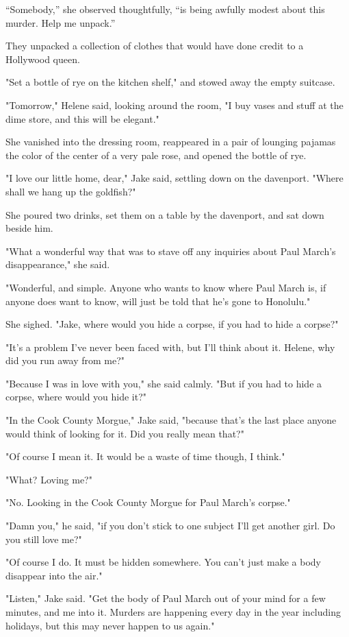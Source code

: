 \documentclass{novel}
\begin{document}
“Somebody,” she observed thoughtfully, “is being awfully modest about this murder. Help me unpack.”

They unpacked a collection of clothes that would have done credit to a Hollywood queen.

"Set a bottle of rye on the kitchen shelf," and stowed away the empty suitcase.

"Tomorrow," Helene said, looking around the room, "I buy vases and stuff at the dime store, and this will be elegant."

She vanished into the dressing room, reappeared in a pair of lounging pajamas the color of the center of a very pale rose, and opened the bottle of rye.

"I love our little home, dear," Jake said, settling down on the davenport. "Where shall we hang up the goldfish?"

She poured two drinks, set them on a table by the davenport, and sat down beside him.

"What a wonderful way that was to stave off any inquiries about Paul March's disappearance," she said.

"Wonderful, and simple. Anyone who wants to know where Paul March is, if anyone does want to know, will just be told that he's gone to Honolulu."

She sighed. "Jake, where would you hide a corpse, if you had to hide a corpse?"

"It's a problem I've never been faced with, but I'll think about it. Helene, why did you run away from me?"

"Because I was in love with you," she said calmly. "But if you had to hide a corpse, where would you hide it?"

"In the Cook County Morgue," Jake said, "because that's the last place anyone would think of looking for it. Did you really mean that?"

"Of course I mean it. It would be a waste of time though, I think."

"What? Loving me?"

"No. Looking in the Cook County Morgue for Paul March's corpse."

"Damn you," he said, "if you don't stick to one subject I'll get another girl. Do you still love me?"

"Of course I do. It must be hidden somewhere. You can't just make a body disappear into the air."

"Listen," Jake said. "Get the body of Paul March out of your mind for a few minutes, and me into it. Murders are happening every day in the year including holidays, but this may never happen to us again."
\end{document}
